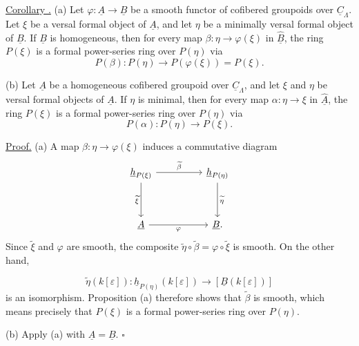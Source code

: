 \underline{Corollary .} (a) Let
$\varphi:\underline A\longrightarrow\underline B$ be a smooth functor
of cofibered groupoids over $\underline C_\Lambda$. Let $\xi$ be a
versal formal object of $\underline A$, and let $\eta$ be a minimally
versal formal object of $\underline B$. If $\underline B$ is
homogeneous, then for every map
$\beta:\eta\longrightarrow\varphi(\xi)$ in
$\widehat{\underline B}$, the ring $P(\xi)$ is a formal power-series
ring over $P(\eta)$ via
\[
 P(\beta):P(\eta)\longrightarrow P(\varphi(\xi))=P(\xi).
\]

(b) Let $\underline A$ be a homogeneous cofibered groupoid over
$\underline C_\Lambda$, and let $\xi$ and $\eta$ be versal formal
objects of $\underline A$. If $\eta$ is minimal, then for every map
$\alpha:\eta\longrightarrow\xi$ in $\widehat{\underline A}$, the
ring $P(\xi)$ is a formal power-series ring over $P(\eta)$ via
\[
 P(\alpha):P(\eta)\longrightarrow P(\xi).
\]

\underline{Proof.} (a) A map
$\beta:\eta\longrightarrow\varphi(\xi)$ induces a commutative
diagram
\[
\begin{tikzcd}[row sep=huge,column sep=huge]
 \underline h_{P(\xi)} \arrow[r,"{\widetilde\beta}"]
                           \arrow[d,"{\widetilde\xi}"']
 & \underline h_{P(\eta)} \arrow[d,"{\widetilde\eta}"]\\
 \underline A \arrow[r,"{\varphi}"'] & \underline B.
\end{tikzcd}
\]
Since $\widetilde\xi$ and $\varphi$ are smooth, the composite
$\widetilde\eta\circ\widetilde\beta
=\varphi\circ\widetilde\xi$ is smooth. On the other hand,


\[
 \widetilde\eta(k[\varepsilon]):
 \underline h_{P(\eta)}(k[\varepsilon])
 \longrightarrow[\underline B(k[\varepsilon])]
\]
is an isomorphism. Proposition (a) therefore shows that
$\widetilde\beta$ is smooth, which means precisely that $P(\xi)$ is
a formal power-series ring over $P(\eta)$.

(b) Apply (a) with $\underline A=\underline B$. \hfill$\square$
